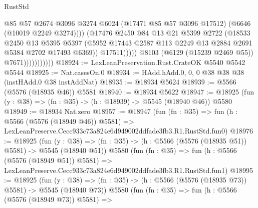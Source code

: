\begin{lexlean}{RustStd}
\begin{coremodule}
                                      @85
                                      @57
                                      @2674
                                      @3096
                                      @3274
                                      @6024
                                      (@17471 @85 @57 @3096 @17512)
                                      (@6646 (@10019 @2249 @3274))))
                                  (@17476
                                    @2450
                                    @84
                                    @13
                                    @21
                                    @5399
                                    @2722
                                    (@18533
                                      @2450
                                      @13
                                      @5395
                                      @5397
                                      (@5952
                                        @17443
                                        @2587
                                        @113
                                        @2249
                                        @13
                                        @2884
                                        @2691
                                        @5384
                                        @2702
                                        @17493
                                        @6369))
                                    @17511)))))
                          @8103
                          (@6129 (@15239 @2469 @55))
                          @7671)))))))))))
@18924 := LexLeanPreservation.Rust.CrateOK @5540 @5542 @5544
@18925 := Nat.casesOn.{0}
@18934 := HAdd.hAdd.{0, 0, 0} @38 @38 @38 (instHAdd.{0} @38 instAddNat)
@18935 := @18934 @5624
@18939 := @5566 (@5576 (@18935 @46)) @5581
@18940 := @18934 @5622
@18947 := @18925 (fun (y : @38) => (fn : @35) -> (h : @18939) -> @5545 (@18940 @46)) @5580
@18949 := @18934 Nat.zero
@18957 := @18947
    (fun (fn : @35) =>
    fun (h : @5566 (@5576 (@18949 @46)) @5581) =>
    LexLeanPreserve.Cecc933c73a824e6d949002ddfade3fb3.R1.RustStd.fun0)
@18976 := @18925
    (fun (y : @38) => (fn : @35) -> (h : @5566 (@5576 (@18935 @51)) @5581) -> @5545 (@18940 @51))
    @5580
    (fun (fn : @35) =>
    fun (h : @5566 (@5576 (@18949 @51)) @5581) =>
    LexLeanPreserve.Cecc933c73a824e6d949002ddfade3fb3.R1.RustStd.fun1)
@18995 := @18925
    (fun (y : @38) => (fn : @35) -> (h : @5566 (@5576 (@18935 @73)) @5581) -> @5545 (@18940 @73))
    @5580
    (fun (fn : @35) =>
    fun (h : @5566 (@5576 (@18949 @73)) @5581) =>

\end{coremodule}
\end{lexlean}
